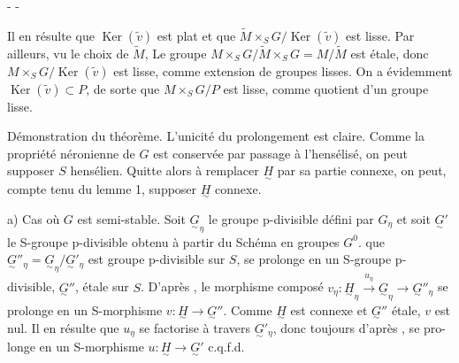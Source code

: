 
-  -

Il en résulte que $\operatorname{Ker}(\widetilde v)$ est plat et que $\widetilde M\times_SG/\operatorname{Ker}(\widetilde v)$ est lisse. Par ailleurs, vu le choix de $\widetilde M$, Le groupe $M\times_SG/\widetilde M\times_SG=M/\widetilde M$ est étale, donc $M\times_SG/\operatorname{Ker}(\widetilde v)$ est lisse, comme extension de groupes lisses. On a évidemment $\operatorname{Ker}(\widetilde v)\subset P$, de sorte que $M\times_SG/P$ est  lisse, comme quotient d'un groupe lisse.

Démonstration du théorème. L'unicité du prolongement est claire. Comme la propriété néronienne de $G$ est conservée par passage à l'hensélisé, on peut supposer $S$ hensélien. Quitte alors à remplacer $\underset{\sim}{H}$ par sa partie connexe, on peut, compte tenu du lemme 1, supposer  $\underset{\sim}{H}$ connexe.

a) Cas où $G$ est semi-stable. Soit $\underset{\sim}{G}_\eta$ le groupe p-divisible défini par $G_\eta$ et soit $\underset{\sim}{G}'$ le S-groupe p-divisible obtenu à partir du Schéma en groupes $G^0$.
que $\underset{\sim}{G}''_\eta=\underset{\sim}{G}_\eta/\underset{\sim}{G}'_\eta$ est  groupe p-divisible   sur $S$,   se prolonge en un S-groupe p-divisible, $\underset{\sim}{G}''$, étale sur $S$. D'après , le morphisme composé $v_\eta:\underset{\sim}{H}_\eta\xrightarrow{u_\eta}\underset{\sim}{G}_\eta\longrightarrow\underset{\sim}{G}''_\eta$ se prolonge en un S-morphisme $v:\underset{\sim}{H}\longrightarrow\underset{\sim}{G}''$. Comme $\underset{\sim}{H}$ est connexe et $\underset{\sim}{G}''$ étale, $v$ est nul.  Il en résulte que $u_\eta$ se factorise à travers $\underset{\sim}{G}'_\eta$, donc toujours d'après , se pro-longe en un S-morphisme $u:\underset{\sim}{H}\longrightarrow\underset{\sim}{G}'$ c.q.f.d.

